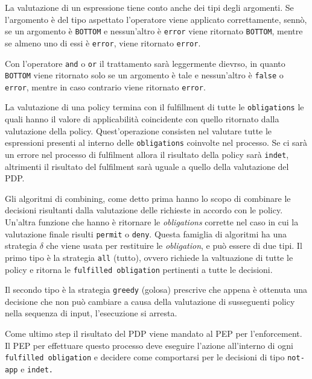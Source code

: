La valutazione di un espressione tiene conto anche dei tipi degli argomenti. Se l'argomento è del tipo aspettato l'operatore viene applicato correttamente, sennò, se un argomento è \texttt{BOTTOM} e nessun'altro è \texttt{error} viene ritornato \texttt{BOTTOM}, mentre se almeno uno di essi è \texttt{error}, viene ritornato \texttt{error}.\\ \par
Con l'operatore \texttt{and} o \texttt{or} il trattamento sarà leggermente dievrso, in quanto \texttt{BOTTOM} viene ritornato solo se un argomento è tale e nessun'altro è \texttt{false} o \texttt{error}, mentre in caso contrario viene ritornato \texttt{error}.\\ \par
La valutazione di una policy termina con il fulfillment di tutte le \texttt{obligations} le quali hanno il valore di applicabilità coincidente con quello ritornato dalla valutazione della policy. Quest'operazione consisten nel valutare tutte le espressioni presenti al interno delle \texttt{obligations} coinvolte nel processo. Se ci sarà un errore nel processo di fulfilment allora il risultato della policy sarà \texttt{indet}, altrimenti il risultato del fulfilment sarà uguale a quello della valutazione del PDP.\\ \par
Gli algoritmi di combining, come detto prima hanno lo scopo di combinare le decisioni risultanti dalla valutazione delle richieste in accordo con le policy. Un'altra funzione che hanno è ritornare le \textit{obligations} corrette nel caso in cui la valutazione finale risulti \texttt{permit} o \texttt{deny}. Questa famiglia di algoritmi ha una strategia $\delta$ che viene usata per restituire le \textit{obligation}, e può essere di due tipi.
Il primo tipo è la strategia \texttt{all} (tutto), ovvero richiede la valtuazione di tutte le policy e ritorna le \texttt{fulfilled obligation} pertinenti a tutte le decisioni.\\ \par
Il secondo tipo è la strategia \texttt{greedy} (golosa) prescrive che appena è ottenuta una decisione che non può cambiare a causa della valutazione di susseguenti policy nella sequenza di input, l'esecuzione si arresta.\\ \par
Come ultimo step il risultato del PDP viene mandato al PEP per l'enforcement.
Il PEP per effettuare questo processo deve eseguire l'azione all'interno di ogni \texttt{fulfilled obligation} e decidere come comportarsi per le decisioni di tipo \texttt{not-app} e \texttt{indet.}\\ \par
